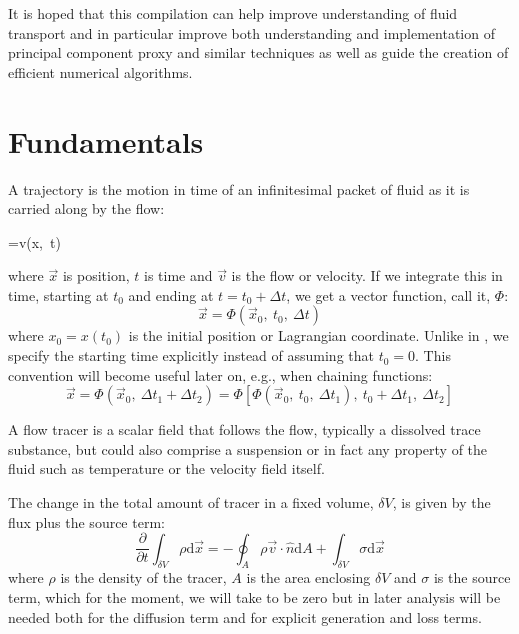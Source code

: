 It is hoped that this compilation
can help improve understanding of fluid transport and in particular 
improve both understanding and implementation of principal component
proxy and similar techniques as well as guide the creation of efficient
numerical algorithms.

\section{Fundamentals}

A trajectory is the motion in time of an infinitesimal packet of fluid
as it is carried along by the flow:
\begin{eqnl}
	=\vec v(\vec x,~t) \label{trajectory_equation}
\end{eqnl}
where $\vec x$ is position, $t$ is time and $\vec v$ is the flow or velocity.
If we integrate this in time, starting at $t_0$ and ending at $t=t_0+\Delta t$, we get a
vector function, call it, $\Phi$:
\begin{equation}
	\vec x=\Phi(\vec x_0,~t_0,~\Delta t)
\label{traj_def}
\end{equation}
where $x_0=x(t_0)$ is the initial position or Lagrangian coordinate.
Unlike in \citet{Ottino1989}, we specify the starting time explicitly instead 
of assuming that $t_0=0$.  This convention will become useful later on, e.g., 
when chaining functions:
\begin{equation}
\vec x=\Phi(\vec x_0,~\Delta t_1+\Delta t_2)=\Phi[\Phi(\vec x_0,~t_0,~\Delta t_1),~t_0 + \Delta t_1,~\Delta t_2]
\label{traj_fun_chaining}
\end{equation}

A flow tracer is a scalar field that follows the flow, typically a dissolved
trace substance, but could also comprise a suspension or in fact any property
of the fluid such as temperature or the velocity field itself.

The change in the total amount of tracer in a fixed volume, $\delta V$, is given
by the flux plus the source term:
\begin{equation}
	\frac{\partial}{\partial t}\int_{\delta V} \rho \mathrm d \vec x=-\oint_A \rho \vec v \cdot \hat n \mathrm d A
	+ \int_{\delta V} \sigma \mathrm d \vec x
	\label{volume_conservation_integral}
\end{equation}
where $\rho$ is the density of the tracer,
$A$ is the area enclosing $\delta V$ and $\sigma$ is the source term, which for the moment,
we will take to be zero but in later analysis will 
be needed both for the diffusion term and for explicit generation and loss terms.

